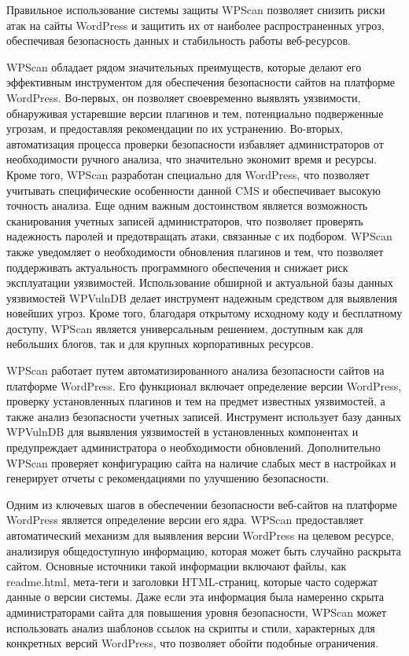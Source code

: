 Правильное использование системы защиты WPScan позволяет снизить риски
атак на сайты WordPress и защитить их от наиболее распространенных
угроз, обеспечивая безопасность данных и стабильность работы
веб-ресурсов.

WPScan обладает рядом значительных преимуществ, которые делают его
эффективным инструментом для обеспечения безопасности сайтов на
платформе WordPress. Во-первых, он позволяет своевременно выявлять
уязвимости, обнаруживая устаревшие версии плагинов и тем, потенциально
подверженные угрозам, и предоставляя рекомендации по их устранению.
Во-вторых, автоматизация процесса проверки безопасности избавляет
администраторов от необходимости ручного анализа, что значительно
экономит время и ресурсы. Кроме того, WPScan разработан специально для
WordPress, что позволяет учитывать специфические особенности данной CMS
и обеспечивает высокую точность анализа. Еще одним важным достоинством
является возможность сканирования учетных записей администраторов, что
позволяет проверять надежность паролей и предотвращать атаки, связанные
с их подбором. WPScan также уведомляет о необходимости обновления
плагинов и тем, что позволяет поддерживать актуальность программного
обеспечения и снижает риск эксплуатации уязвимостей. Использование
обширной и актуальной базы данных уязвимостей WPVulnDB делает инструмент
надежным средством для выявления новейших угроз. Кроме того, благодаря
открытому исходному коду и бесплатному доступу, WPScan является
универсальным решением, доступным как для небольших блогов, так и для
крупных корпоративных ресурсов.

WPScan работает путем автоматизированного анализа безопасности сайтов на
платформе WordPress. Его функционал включает определение версии
WordPress, проверку установленных плагинов и тем на предмет известных
уязвимостей, а также анализ безопасности учетных записей. Инструмент
использует базу данных WPVulnDB для выявления уязвимостей в
установленных компонентах и предупреждает администратора о необходимости
обновлений. Дополнительно WPScan проверяет конфигурацию сайта на наличие
слабых мест в настройках и генерирует отчеты с рекомендациями по
улучшению безопасности.

Одним из ключевых шагов в обеспечении безопасности веб-сайтов на
платформе WordPress является определение версии его ядра. WPScan
предоставляет автоматический механизм для выявления версии WordPress на
целевом ресурсе, анализируя общедоступную информацию, которая может быть
случайно раскрыта сайтом. Основные источники такой информации включают
файлы, как readme.html, мета-теги и заголовки HTML-страниц, которые
часто содержат данные о версии системы. Даже если эта информация была
намеренно скрыта администраторами сайта для повышения уровня
безопасности, WPScan может использовать анализ шаблонов ссылок на
скрипты и стили, характерных для конкретных версий WordPress, что
позволяет обойти подобные ограничения.

